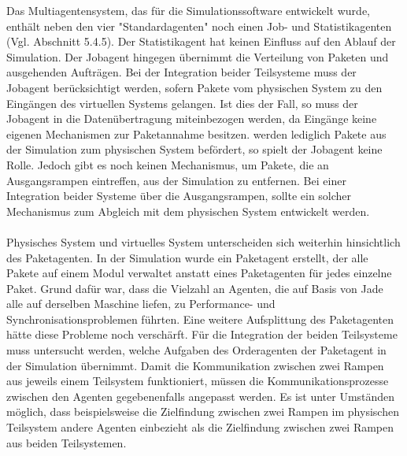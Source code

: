 Das Multiagentensystem, das für die Simulationssoftware entwickelt wurde, enthält neben den vier "Standardagenten" noch einen Job- und Statistikagenten (Vgl. Abschnitt 5.4.5). Der Statistikagent hat keinen Einfluss auf den Ablauf der Simulation. Der Jobagent hingegen übernimmt die Verteilung von Paketen und ausgehenden Aufträgen. Bei der Integration beider Teilsysteme muss der Jobagent berücksichtigt werden, sofern Pakete vom physischen System zu den Eingängen des virtuellen Systems  gelangen. Ist dies der Fall, so muss der Jobagent in die Datenübertragung miteinbezogen werden, da Eingänge keine eigenen Mechanismen zur Paketannahme besitzen. werden lediglich Pakete aus der Simulation zum physischen System befördert, so spielt der Jobagent keine Rolle. Jedoch gibt es noch keinen Mechanismus, um Pakete, die an Ausgangsrampen eintreffen, aus der Simulation zu entfernen. Bei einer Integration beider Systeme über die Ausgangsrampen, sollte ein solcher Mechanismus zum Abgleich mit dem physischen System entwickelt werden. 
\\\\
Physisches System und virtuelles System unterscheiden sich weiterhin hinsichtlich des Paketagenten. In der Simulation wurde ein Paketagent erstellt, der alle Pakete auf einem Modul verwaltet anstatt eines Paketagenten für jedes einzelne Paket. Grund dafür war, dass die Vielzahl an Agenten, die auf Basis von Jade alle auf derselben Maschine liefen, zu Performance- und Synchronisationsproblemen führten. Eine weitere Aufsplittung des Paketagenten hätte diese Probleme noch verschärft. Für die Integration der beiden Teilsysteme muss untersucht werden, welche Aufgaben des Orderagenten der Paketagent in der Simulation übernimmt. Damit die Kommunikation zwischen zwei Rampen aus jeweils einem Teilsystem funktioniert, müssen die Kommunikationsprozesse zwischen den Agenten gegebenenfalls angepasst werden. Es ist unter Umständen möglich, dass beispielsweise die Zielfindung zwischen zwei Rampen im physischen Teilsystem andere Agenten einbezieht als die Zielfindung zwischen zwei Rampen aus beiden Teilsystemen.